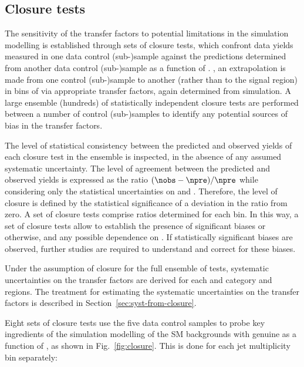 \subsection{Closure tests\label{sec:closure-tests-desc}}

The sensitivity of the transfer factors to potential limitations in
the simulation modelling is established through sets of closure tests,
which confront data yields measured in one data control (sub-)sample
against the predictions determined from another data control
(sub-)sample as a function of \scalht. \ie, an extrapolation is made
from one control (sub-)sample to another (rather than to the signal
region) in bins of \scalht via appropriate transfer factors, again
determined from simulation. A large ensemble (\ie hundreds) of
statistically independent closure tests are performed between a number
of control (sub-)samples to identify any potential sources of bias in
the transfer factors.

The level of statistical consistency between the predicted and
observed yields of each closure test in the ensemble is inspected, in
the absence of any assumed systematic uncertainty. The level of
agreement between the predicted and observed yields is expressed as
the ratio $(\nobs - \npre)/\npre$ while considering only the
statistical uncertainties on \npre and \nobs. Therefore, the level of
closure is defined by the statistical significance of a deviation in
the ratio from zero. A set of closure tests comprise ratios determined
for each \scalht bin. In this way, a set of closure tests allow to
establish the presence of significant biases or otherwise, and any
possible dependence on \scalht. If statistically significant biases
are observed, further studies are required to understand and correct
for these biases.

Under the assumption of closure for the full ensemble of tests,
systematic uncertainties on the transfer factors are derived for each
\njet and \nb category and \scalht regions. The treatment for
estimating the systematic uncertainties on the transfer factors is
described in Section~\ref{sec:syst-from-closure}.

Eight sets of closure tests use the five data control samples to
probe key ingredients of the simulation modelling of the SM
backgrounds with genuine \met as a function of \scalht, as shown in
Fig.~\ref{fig:closure}. This is done for each jet multiplicity bin
separately: 

